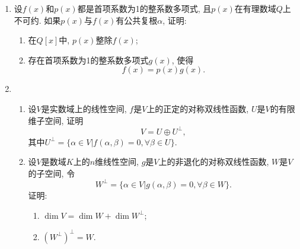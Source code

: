 \documentclass[12pt,a4paper,openany]{book}
\begin{document}
\begin{enumerate}
\item 设$f(x)$和$p(x)$都是首项系数为1的整系数多项式, 且$p(x)$在有理数域$Q$上不可约. 如果$p(x)$与$f(x)$有公共复根$\alpha$, 证明:
\begin{enumerate}
\item 在$Q[x]$中, $p(x)$整除$f(x)$;
\item 存在首项系数为1的整系数多项式$g(x)$, 使得
\[
f(x) = p(x)g(x).
\]
\end{enumerate}

\item 
\begin{enumerate}
\item 设$V$是实数域上的线性空间, $f$是$V$上的正定的对称双线性函数, $U$是$V$的有限维子空间, 证明
\[
V = U \oplus U^{\perp},
\]
其中$U^{\perp} = \{ \alpha \in V | f(\alpha, \beta) = 0, \forall \beta  \in U \}$.

\item 设$V$是数域$K$上的$n$维线性空间, $g$是$V$上的非退化的对称双线性函数, $W$是$V$的子空间, 令
\[
W^{\perp} = \{ \alpha \in V | g(\alpha, \beta) = 0, \forall \beta \in W \}.
\]
证明:
\begin{enumerate}
\item $\dim{V} = \dim{W} + \dim{W^{\perp}}$;
\item $(W^{\perp})^{\perp} = W$.
\end{enumerate}
\end{enumerate}

\end{enumerate}
\end{document}
